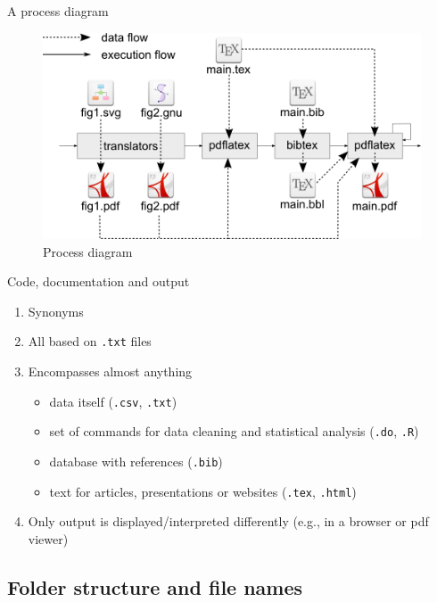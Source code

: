 \documentclass[ignorenonframetext]{beamer}
\begin{document}
{\begin{frame}{A process diagram}
\begin{figure}[htbp]
\centering
\includegraphics[width=\textwidth]{fig/process.png}
\caption{Process diagram}
\end{figure}

\end{frame}

\begin{frame}[fragile]{Code, documentation and output}

\begin{enumerate}
\def\labelenumi{\arabic{enumi}.}
\item
  Synonyms
\item
  All based on \texttt{.txt} files
\item
  Encompasses almost anything

  \begin{itemize}
  \item
    data itself (\texttt{.csv}, \texttt{.txt})
  \item
    set of commands for data cleaning and statistical analysis
    (\texttt{.do}, \texttt{.R})
  \item
    database with references (\texttt{.bib})
  \item
    text for articles, presentations or websites (\texttt{.tex},
    \texttt{.html})
  \end{itemize}
\item
  Only output is displayed/interpreted differently (e.g., in a browser
  or pdf viewer)
\end{enumerate}

\end{frame}

\subsection{Folder structure and file
names}\label{folder-structure-and-file-names}

}
\end{document}
